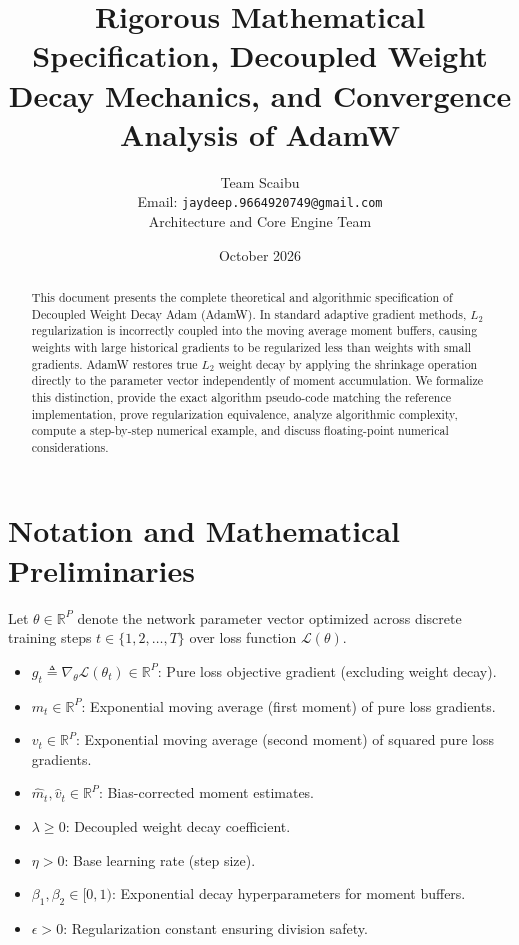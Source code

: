 \documentclass[11pt,a4paper]{article}
\title{\textbf{Rigorous Mathematical Specification, Decoupled Weight Decay Mechanics, and Convergence Analysis of AdamW}}
\author{Team Scaibu \\ \small Email: \texttt{jaydeep.9664920749@gmail.com} \\ \small Architecture and Core Engine Team}
\date{October 2026}
\theoremstyle{definition}
\begin{document}
\maketitle

\begin{abstract}
This document presents the complete theoretical and algorithmic specification of Decoupled Weight Decay Adam (AdamW). In standard adaptive gradient methods, $L_2$ regularization is incorrectly coupled into the moving average moment buffers, causing weights with large historical gradients to be regularized less than weights with small gradients. AdamW restores true $L_2$ weight decay by applying the shrinkage operation directly to the parameter vector independently of moment accumulation. We formalize this distinction, provide the exact algorithm pseudo-code matching the reference implementation, prove regularization equivalence, analyze algorithmic complexity, compute a step-by-step numerical example, and discuss floating-point numerical considerations.
\end{abstract}

\section{Notation and Mathematical Preliminaries}

Let $\theta \in \mathbb{R}^P$ denote the network parameter vector optimized across discrete training steps $t \in \{1, 2, \dots, T\}$ over loss function $\mathcal{L}(\theta)$.

\begin{itemize}
    \item $g_t \triangleq \nabla_\theta \mathcal{L}(\theta_t) \in \mathbb{R}^P$: Pure loss objective gradient (excluding weight decay).
    \item $m_t \in \mathbb{R}^P$: Exponential moving average (first moment) of pure loss gradients.
    \item $v_t \in \mathbb{R}^P$: Exponential moving average (second moment) of squared pure loss gradients.
    \item $\hat{m}_t, \hat{v}_t \in \mathbb{R}^P$: Bias-corrected moment estimates.
    \item $\lambda \ge 0$: Decoupled weight decay coefficient.
    \item $\eta > 0$: Base learning rate (step size).
    \item $\beta_1, \beta_2 \in [0, 1)$: Exponential decay hyperparameters for moment buffers.
    \item $\epsilon > 0$: Regularization constant ensuring division safety.
\end{itemize}
\end{document}

